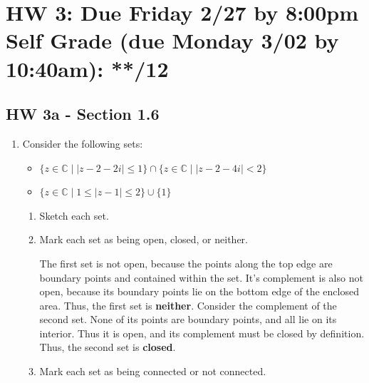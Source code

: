 
\newpage
\section*{HW 3: Due Friday 2/27 by 8:00pm \\ Self Grade (due Monday 3/02 by 10:40am): **/12} 

\subsection*{HW 3a - Section 1.6}
\begin{enumerate}
	\item Consider the following sets:
	\begin{itemize}
		\item $\{z \in \mathbb{C} \mid |z-2-2i| \leq 1\} \cap \{z \in \mathbb{C} \mid |z-2-4i| < 2\}$
		\item $\{z \in \mathbb{C} \mid 1 \leq |z-1| \leq 2\} \cup \{1\}$
	\end{itemize}
	\begin{enumerate}
		\item Sketch each set.
		\item Mark each set as being open, closed, or neither.
		\begin{problem}
			The first set is not open, because the points along the top edge are boundary points and contained within the set. It's complement is also not open, because its boundary points lie on the bottom edge of the enclosed area. Thus, the first set is \textbf{neither}.\gline{}
			Consider the complement of the second set. None of its points are boundary points, and all lie on its interior. Thus it is open, and its complement must be closed by definition. Thus, the second set is \textbf{closed}.
		\end{problem}
		\item Mark each set as being connected or not connected.
		\begin{problem}

\end{problem}
\end{enumerate}
\end{enumerate}

